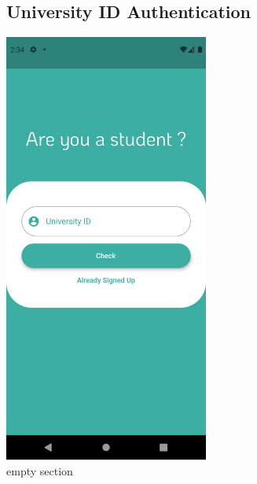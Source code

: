 \documentclass[12pt]{article}
\begin{document}
\begin{figure}[h!]
\vspace{-2cm}
\subsection*{University ID Authentication}
\centerline{\includegraphics[width=0.6\textwidth]{./Screenshots/2.PNG}}
  \caption{empty section}
\end{figure}
\end{document}
